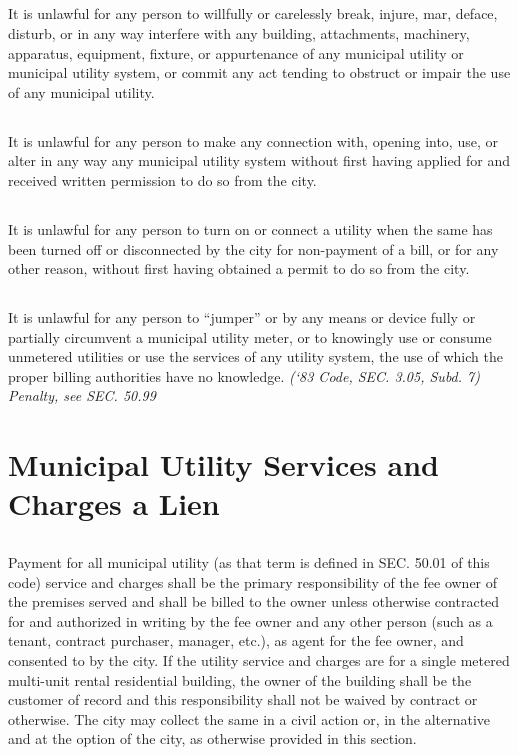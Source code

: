 \documentclass[code.tex]{subfiles}
\begin{document}
\subsection{}
It is unlawful for any person to willfully or carelessly break, injure, mar, deface, disturb, or in any way interfere with any building, attachments, machinery, apparatus, equipment, fixture, or appurtenance of any municipal utility or municipal utility system, or commit any act tending to obstruct or impair the use of any municipal utility.
\subsection{}
It is unlawful for any person to make any connection with, opening into, use, or alter in any way any municipal utility system without first having applied for and received written permission to do so from the city.
\subsection{}
It is unlawful for any person to turn on or connect a utility when the same has been turned off or disconnected by the city for non-payment of a bill, or for any other reason, without first having obtained a permit to do so from the city.
\subsection{}
It is unlawful for any person to “jumper” or by any means or device fully or partially circumvent a municipal utility meter, or to knowingly use or consume unmetered utilities or use the services of any utility system, the use of which the proper billing authorities have no knowledge.\newline
\emph{(‘83 Code, SEC. 3.05, Subd. 7)  Penalty, see SEC. 50.99}
\section{Municipal Utility Services and Charges a Lien}
\subsection{}
Payment for all municipal utility (as that term is defined in SEC. 50.01 of this code) service and charges shall be the primary responsibility of the fee owner of the premises served and shall be billed to the owner unless otherwise contracted for and authorized in writing by the fee owner and any other person (such as a tenant, contract purchaser, manager, etc.), as agent for the fee owner, and consented to by the city.  If the utility service and charges are for a single metered multi-unit rental residential building, the owner of the building shall be the customer of record and this responsibility shall not be waived by contract or otherwise.  The city may collect the same in a civil action or, in the alternative and at the option of the city, as otherwise provided in this section.
\end{document}
